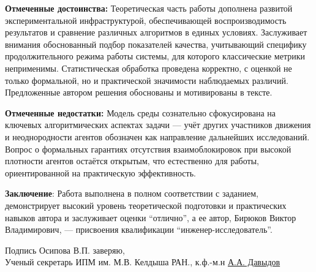 \documentclass[fontsize=12pt, master]{diploma}
\begin{document}
\fillReviewHeader

\textbf{Отмеченные достоинства:}
Теоретическая часть работы дополнена развитой экспериментальной инфраструктурой, обеспечивающей
воспроизводимость результатов и сравнение различных алгоритмов в единых условиях. Заслуживает
внимания обоснованный подбор показателей качества, учитывающий специфику продолжительного режима
работы системы, для которого классические метрики неприменимы. Статистическая обработка проведена
корректно, с оценкой не только формальной, но и практической значимости наблюдаемых различий.
Предложенные автором решения обоснованы и мотивированы в тексте.

\textbf{Отмеченные недостатки:}
Модель среды сознательно сфокусирована на ключевых алгоритмических аспектах задачи --- учёт других
участников движения и неоднородности агентов обозначен как направление дальнейших исследований.
Вопрос о формальных гарантиях отсутствия взаимоблокировок при высокой плотности агентов остаётся
открытым, что естественно для работы, ориентированной на практическую эффективность.

\textbf{Заключение}:
Работа выполнена в полном соответствии с заданием, демонстрирует высокий уровень теоретической
подготовки и практических навыков автора и заслуживает оценки \enquote{отлично}, а ее автор, 
Бирюков Виктор Владимирович, --- присвоения квалификации \enquote{инженер-исследователь}.

\makeReviewSignature

\vfill

Подпись Осипова В.П. заверяю,\\
Ученый секретарь ИПМ им. М.В. Келдыша РАН., к.ф.-м.н\hfill
\uline{\hspace{2.5cm} А.А. Давыдов}
\end{document}
